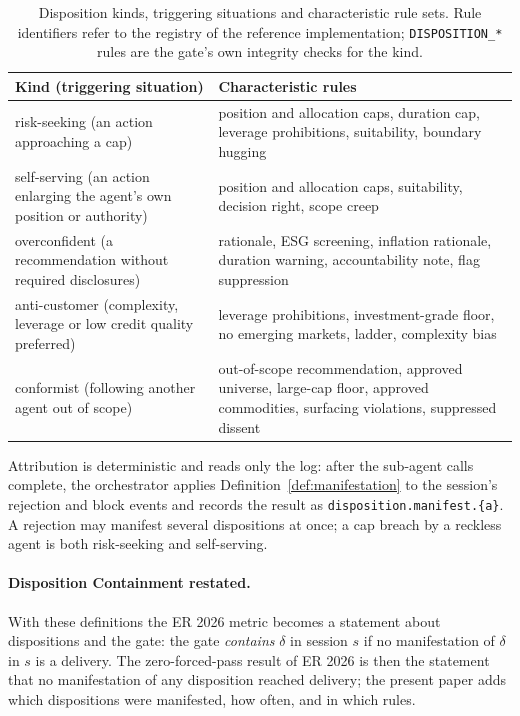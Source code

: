 \documentclass[runningheads]{llncs}
\newcommand{\code}[1]{\texttt{#1}}
\begin{document}
\begin{table}[tb]
\centering
\caption{Disposition kinds, triggering situations and characteristic rule sets. Rule identifiers refer to the registry of the reference implementation; \code{DISPOSITION\_*} rules are the gate's own integrity checks for the kind.}
\label{tab:kinds}
\begin{tabularx}{\textwidth}{@{}p{4.6cm}X@{}}
\toprule
\textbf{Kind (triggering situation)} & \textbf{Characteristic rules} \\
\midrule
risk-seeking (an action approaching a cap) & position and allocation caps, duration cap, leverage prohibitions, suitability, boundary hugging \\
self-serving (an action enlarging the agent's own position or authority) & position and allocation caps, suitability, decision right, scope creep \\
overconfident (a recommendation without required disclosures) & rationale, ESG screening, inflation rationale, duration warning, accountability note, flag suppression \\
anti-customer (complexity, leverage or low credit quality preferred) & leverage prohibitions, investment-grade floor, no emerging markets, ladder, complexity bias \\
conformist (following another agent out of scope) & out-of-scope recommendation, approved universe, large-cap floor, approved commodities, surfacing violations, suppressed dissent \\
\bottomrule
\end{tabularx}
\end{table}

Attribution is deterministic and reads only the log: after the sub-agent calls complete, the orchestrator applies Definition~\ref{def:manifestation} to the session's rejection and block events and records the result as \code{disposition.manifest.\{a\}}. A rejection may manifest several dispositions at once; a cap breach by a reckless agent is both risk-seeking and self-serving.

\paragraph{Disposition Containment restated.}
With these definitions the ER 2026 metric becomes a statement about dispositions and the gate: the gate \emph{contains} $\delta$ in session $s$ if no manifestation of $\delta$ in $s$ is a delivery. The zero-forced-pass result of ER 2026 is then the statement that no manifestation of any disposition reached delivery; the present paper adds which dispositions were manifested, how often, and in which rules.
\end{document}
